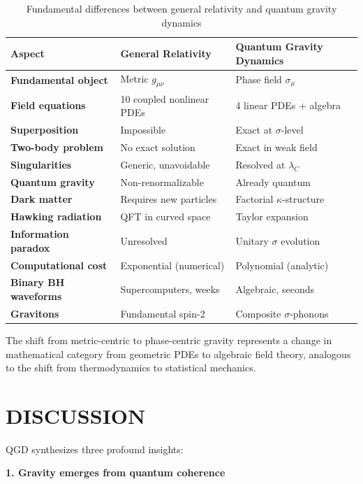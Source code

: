 \documentclass[11pt,a4paper]{article}
\theoremstyle{definition}
\theoremstyle{remark}
\begin{document}
	\begin{table}[h]
		\centering
		\caption{Fundamental differences between general relativity and quantum gravity dynamics}
		\label{tab:gr_vs_qgd}
		\begin{tabular}{lll}
			\toprule
			Aspect & General Relativity & Quantum Gravity Dynamics \\
			\midrule
			\textbf{Fundamental object} & Metric $g_{\mu\nu}$ & Phase field $\sigma_\mu$ \\
			\textbf{Field equations} & 10 coupled nonlinear PDEs & 4 linear PDEs + algebra \\
			\textbf{Superposition} & Impossible & Exact at $\sigma$-level \\
			\textbf{Two-body problem} & No exact solution & Exact in weak field \\
			\textbf{Singularities} & Generic, unavoidable & Resolved at $\lambda_C$ \\
			\textbf{Quantum gravity} & Non-renormalizable & Already quantum \\
			\textbf{Dark matter} & Requires new particles & Factorial $\kappa$-structure \\
			\textbf{Hawking radiation} & QFT in curved space & Taylor expansion \\
			\textbf{Information paradox} & Unresolved & Unitary $\sigma$ evolution \\
			\textbf{Computational cost} & Exponential (numerical) & Polynomial (analytic) \\
			\textbf{Binary BH waveforms} & Supercomputers, weeks & Algebraic, seconds \\
			\textbf{Gravitons} & Fundamental spin-2 & Composite $\sigma$-phonons \\
			\bottomrule
		\end{tabular}
	\end{table}
	
	The shift from metric-centric to phase-centric gravity represents a change in mathematical category from geometric PDEs to algebraic field theory, analogous to the shift from thermodynamics to statistical mechanics.
	
	\section{DISCUSSION}
	\label{sec:discussion}
	
	QGD synthesizes three profound insights:
	
	\textbf{1. Gravity emerges from quantum coherence}
	
\end{document}
